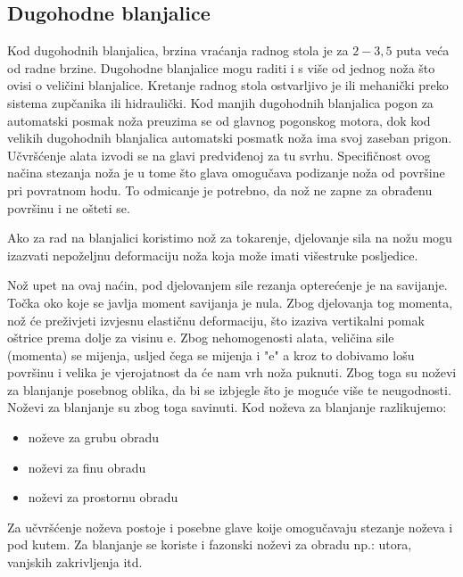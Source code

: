 \documentclass[a4paper,12pt]{article}
\numberwithin{figure}{section}
\begin{document}
\subsection{Dugohodne blanjalice}
Kod dugohodnih blanjalica, brzina vraćanja radnog stola je  za $2 -3,5$ puta veća od radne brzine. Dugohodne blanjalice mogu raditi i s više od jednog noža što ovisi o veličini blanjalice. Kretanje radnog stola ostvarljivo je ili mehanički preko sistema zupčanika ili hidraulički. Kod manjih dugohodnih blanjalica pogon za automatski posmak noža preuzima se od glavnog pogonskog motora, dok kod velikih dugohodnih blanjalica automatski posmatk noža ima svoj zaseban prigon. Učvršćenje alata izvodi se na glavi predviđenoj za tu svrhu.
Specifičnost ovog načina stezanja noža je u tome što glava omogučava podizanje noža od površine pri povratnom hodu. To odmicanje je potrebno, da nož ne zapne za obrađenu površinu i ne ošteti se.\par 
Ako za rad na blanjalici koristimo nož za tokarenje, djelovanje sila na nožu mogu izazvati nepoželjnu deformaciju noža koja može imati višestruke posljedice. \par
Nož upet na ovaj naćin, pod djelovanjem sile rezanja opterećenje je na savijanje. Točka oko koje se javlja moment savijanja je nula. Zbog djelovanja tog momenta, nož će preživjeti izvjesnu elastičnu deformaciju, što izaziva vertikalni pomak oštrice prema dolje za visinu e. Zbog nehomogenosti alata, veličina sile (momenta) se mijenja, usljed čega se mijenja i "e" a kroz to dobivamo lošu površinu i velika je vjerojatnost da će nam vrh noža puknuti. Zbog toga su noževi za blanjanje posebnog oblika, da bi se izbjegle što je moguće više te neugodnosti. Noževi za blanjanje su zbog toga savinuti.
Kod noževa za blanjanje razlikujemo:
\begin{itemize}
\item noževe za grubu obradu
\item noževi za finu obradu
\item noževi za prostornu obradu
\end{itemize}
Za učvršćenje noževa postoje i posebne glave koije omogučavaju stezanje noževa i pod kutem. Za blanjanje se koriste i fazonski noževi za obradu np.: utora, vanjskih zakrivljenja itd.
\end{document}
